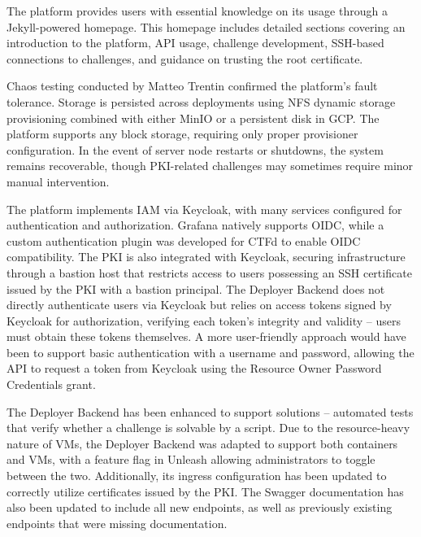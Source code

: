 The platform provides users with essential knowledge on its usage through a Jekyll-powered homepage. This homepage includes detailed sections covering an introduction to the platform, API usage, challenge development, SSH-based connections to challenges, and guidance on trusting the root certificate.

Chaos testing conducted by Matteo Trentin confirmed the platform's fault tolerance. Storage is persisted across deployments using NFS dynamic storage provisioning combined with either MinIO or a persistent disk in GCP. The platform supports any block storage, requiring only proper provisioner configuration. In the event of server node restarts or shutdowns, the system remains recoverable, though PKI-related challenges may sometimes require minor manual intervention.

The platform implements IAM via Keycloak, with many services configured for authentication and authorization. Grafana natively supports OIDC, while a custom authentication plugin was developed for CTFd to enable OIDC compatibility. The PKI is also integrated with Keycloak, securing infrastructure through a bastion host that restricts access to users possessing an SSH certificate issued by the PKI with a bastion principal. The Deployer Backend does not directly authenticate users via Keycloak but relies on access tokens signed by Keycloak for authorization, verifying each token's integrity and validity -- users must obtain these tokens themselves. A more user-friendly approach would have been to support basic authentication with a username and password, allowing the API to request a token from Keycloak using the Resource Owner Password Credentials grant.

The Deployer Backend has been enhanced to support solutions -- automated tests that verify whether a challenge is solvable by a script. Due to the resource-heavy nature of VMs, the Deployer Backend was adapted to support both containers and VMs, with a feature flag in Unleash allowing administrators to toggle between the two. Additionally, its ingress configuration has been updated to correctly utilize certificates issued by the PKI. The Swagger documentation has also been updated to include all new endpoints, as well as previously existing endpoints that were missing documentation.

